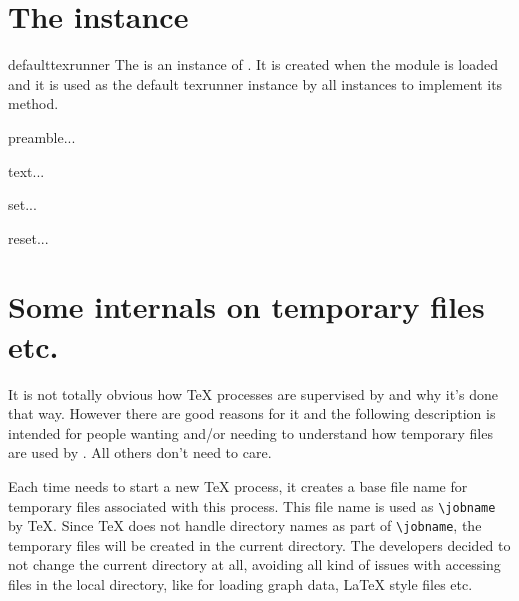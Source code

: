 \section{The  instance}

\begin{datadesc}{defaulttexrunner}
  The  is an instance of . It
  is created when the  module is loaded and it is used as
  the default texrunner instance by all  instances to
  implement its  method.
\end{datadesc}

\begin{funcdesc}{preamble}{...}
\end{funcdesc}

\begin{funcdesc}{text}{...}
\end{funcdesc}

\begin{funcdesc}{set}{...}
\end{funcdesc}

\begin{funcdesc}{reset}{...}
\end{funcdesc}

\section{Some internals on temporary files etc.}

It is not totally obvious how \TeX{} processes are supervised by
\PyX{} and why it's done that way. However there are good reasons for
it and the following description is intended for people wanting and/or
needing to understand how temporary files are used by \PyX. All others
don't need to care.

Each time \PyX{} needs to start a new \TeX{} process, it creates a
base file name for temporary files associated with this process. This
file name is used as \verb|\jobname| by \TeX. Since \TeX{} does not
handle directory names as part of \verb|\jobname|, the temporary files
will be created in the current directory. The \PyX{} developers
decided to not change the current directory at all, avoiding all kind
of issues with accessing files in the local directory, like for
loading graph data, \LaTeX{} style files etc.

